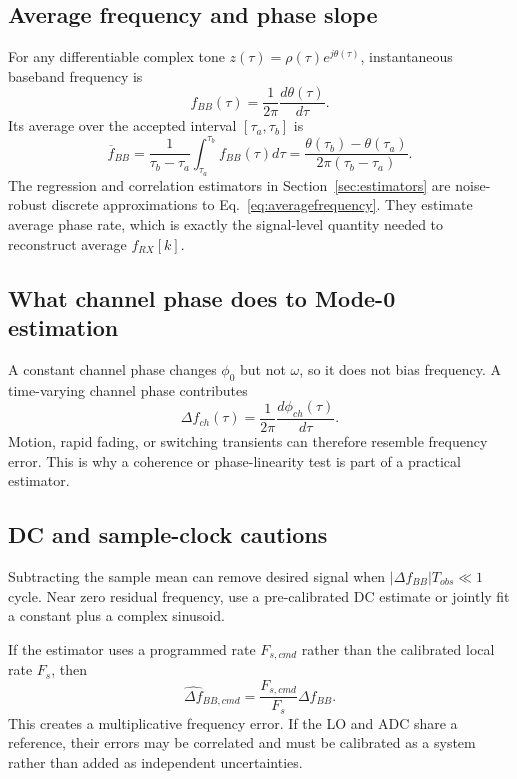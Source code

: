 \documentclass[10pt,a4paper]{article}
\begin{document}
\subsection{Average frequency and phase slope}
For any differentiable complex tone $z(\tau)=\rho(\tau)e^{j\theta(\tau)}$, instantaneous baseband frequency is
\begin{equation}
f_{BB}(\tau)=\frac{1}{2\pi}\frac{d\theta(\tau)}{d\tau}.
\end{equation}
Its average over the accepted interval $[\tau_a,\tau_b]$ is
\begin{equation}
\overline f_{BB}=\frac{1}{\tau_b-\tau_a}\int_{\tau_a}^{\tau_b}f_{BB}(\tau)d\tau
=\frac{\theta(\tau_b)-\theta(\tau_a)}{2\pi(\tau_b-\tau_a)}.
\label{eq:averagefrequency}
\end{equation}
The regression and correlation estimators in Section~\ref{sec:estimators} are noise-robust discrete approximations to Eq.~\ref{eq:averagefrequency}. They estimate average phase rate, which is exactly the signal-level quantity needed to reconstruct average $f_{RX}[k]$.

\subsection{What channel phase does to Mode-0 estimation}
A constant channel phase changes $\phi_0$ but not $\omega$, so it does not bias frequency. A time-varying channel phase contributes
\begin{equation}
\Delta f_{ch}(\tau)=\frac{1}{2\pi}\frac{d\phi_{ch}(\tau)}{d\tau}.
\end{equation}
Motion, rapid fading, or switching transients can therefore resemble frequency error. This is why a coherence or phase-linearity test is part of a practical estimator.

\subsection{DC and sample-clock cautions}
Subtracting the sample mean can remove desired signal when $|\Delta f_{BB}|T_{obs}\ll1$ cycle. Near zero residual frequency, use a pre-calibrated DC estimate or jointly fit a constant plus a complex sinusoid.

If the estimator uses a programmed rate $F_{s,cmd}$ rather than the calibrated local rate $F_s$, then
\begin{equation}
\widehat{\Delta f}_{BB,cmd}=\frac{F_{s,cmd}}{F_s}\Delta f_{BB}.
\end{equation}
This creates a multiplicative frequency error. If the LO and ADC share a reference, their errors may be correlated and must be calibrated as a system rather than added as independent uncertainties.
\end{document}
